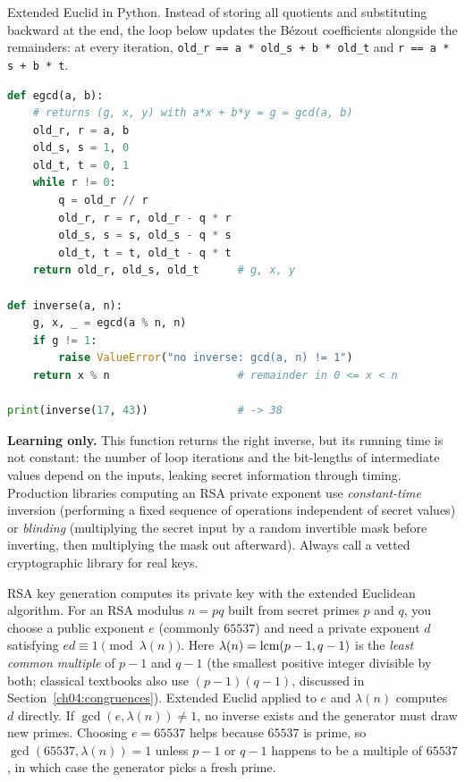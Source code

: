 \begin{implementbox}
Extended Euclid in Python. Instead of storing all quotients and substituting backward at the end,
the loop below updates the B\'ezout coefficients alongside the remainders: at every iteration,
\texttt{old\_r == a * old\_s + b * old\_t} and \texttt{r == a * s + b * t}.

\begin{lstlisting}[language=Python]
def egcd(a, b):
    # returns (g, x, y) with a*x + b*y = g = gcd(a, b)
    old_r, r = a, b
    old_s, s = 1, 0
    old_t, t = 0, 1
    while r != 0:
        q = old_r // r
        old_r, r = r, old_r - q * r
        old_s, s = s, old_s - q * s
        old_t, t = t, old_t - q * t
    return old_r, old_s, old_t      # g, x, y

def inverse(a, n):
    g, x, _ = egcd(a % n, n)
    if g != 1:
        raise ValueError("no inverse: gcd(a, n) != 1")
    return x % n                    # remainder in 0 <= x < n

print(inverse(17, 43))              # -> 38
\end{lstlisting}

\textbf{Learning only.} This function returns the right inverse, but its running time is not
constant: the number of loop iterations and the bit-lengths of intermediate values depend on the
inputs, leaking secret information through timing. Production libraries computing an RSA private
exponent use \emph{constant-time} inversion (performing a fixed sequence of operations independent
of secret values) or \emph{blinding} (multiplying the secret input by a random invertible mask
before inverting, then multiplying the mask out afterward). Always call a vetted cryptographic
library for real keys.
\end{implementbox}

\begin{applicationbox}
RSA key generation computes its private key with the extended Euclidean algorithm. For an RSA
modulus $n = pq$ built from secret primes $p$ and $q$, you choose a public exponent $e$ (commonly
$65537$) and need a private exponent $d$ satisfying $ed \equiv 1 \pmod{\lambda(n)}$. Here
$\lambda(n) = \operatorname{lcm}(p-1, q-1)$ is the \emph{least common multiple} of $p - 1$ and $q - 1$ (the
smallest positive integer divisible by both; classical textbooks also use $(p-1)(q-1)$, discussed in
Section~\ref{ch04:congruences}). Extended Euclid applied to $e$ and $\lambda(n)$ computes $d$
directly. If $\gcd(e, \lambda(n)) \neq 1$, no inverse exists and the generator must draw new primes.
Choosing $e = 65537$ helps because $65537$ is prime, so $\gcd(65537, \lambda(n)) = 1$ unless $p - 1$
or $q - 1$ happens to be a multiple of $65537$, in which case the generator picks a fresh prime.
\end{applicationbox}

